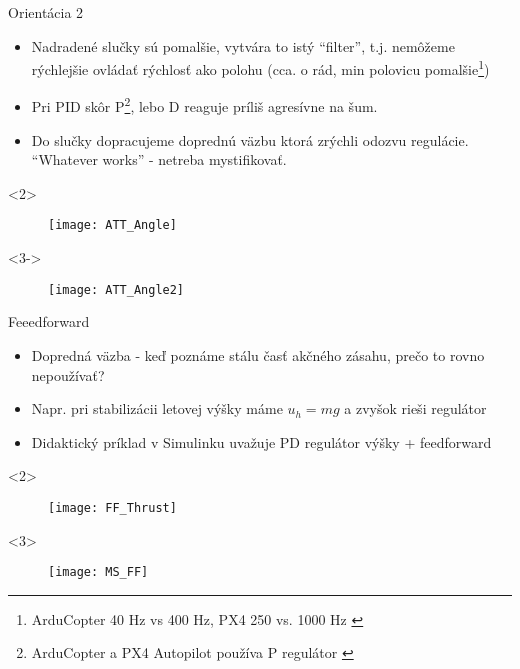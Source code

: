\begin{frame}[t]{Orientácia 2}
\begin{itemize}
  \item<1-> Nadradené slučky sú pomalšie, vytvára to istý ``filter'', t.j. nemôžeme rýchlejšie ovládať rýchlosť ako polohu (cca. o rád, min polovicu pomalšie\footnote{ArduCopter 40 Hz vs 400 Hz, PX4 250 vs. 1000 Hz \citep{AP:PID,PX4:PID}}) \citep{AP:PID,PX4:PID}
  \item<2-> Pri PID skôr P\footnote{ArduCopter a PX4 Autopilot používa P regulátor \citep{PX4:PID,AP:PIDDOC}}, lebo D reaguje príliš agresívne na šum.
  \item<3-> Do slučky dopracujeme doprednú väzbu  ktorá zrýchli odozvu regulácie. ``Whatever works'' - netreba mystifikovať.
  \end{itemize}



  \begin{onlyenv}<2>
  \begin{figure}
\centering
  \texttt{[image: ATT\_Angle]}\\
\end{figure}
\end{onlyenv}

  \begin{onlyenv}<3->
\begin{figure}
\centering
  \texttt{[image: ATT\_Angle2]}\\
 \end{figure}
\end{onlyenv}

  \end{frame}

\begin{frame}[t]{Feeedforward}
\begin{itemize}
  \item<1-> Dopredná väzba - keď poznáme stálu časť akčného zásahu, prečo to rovno nepoužívať?
  \item<2-> Napr. pri stabilizácii letovej výšky máme $u_h=mg$ a zvyšok rieši regulátor
  \item<3-> Didaktický príklad v Simulinku uvažuje PD regulátor výšky + feedforward

  \end{itemize}



  \begin{onlyenv}<2>
  \begin{figure}
\centering
  \texttt{[image: FF\_Thrust]}\\
\end{figure}
\end{onlyenv}

  \begin{onlyenv}<3>
\begin{figure}
\centering
  \texttt{[image: MS\_FF]}\\
 \end{figure}
\end{onlyenv}

  \end{frame}



